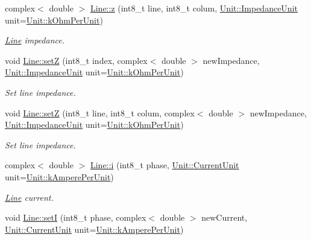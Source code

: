 \begin{DoxyCompactItemize}
complex$<$ double $>$ \hyperlink{group___models_ga508b2db19afc02064c1afe494a25ebcc}{Line\+::z} (int8\+\_\+t line, int8\+\_\+t colum, \hyperlink{class_unit_a3747e779c805df24a71961290be3fbdf}{Unit\+::\+Impedance\+Unit} unit=\hyperlink{class_unit_a3747e779c805df24a71961290be3fbdfa9327dc8628a47375d70037499f9d0910}{Unit\+::k\+Ohm\+Per\+Unit})
\begin{DoxyCompactList}\small\item\em \hyperlink{class_line}{Line} impedance. \end{DoxyCompactList}\item 
void \hyperlink{group___models_ga2b8fe47ae4ae2d4422d9431e17b4927d}{Line\+::set\+Z} (int8\+\_\+t index, complex$<$ double $>$ new\+Impedance, \hyperlink{class_unit_a3747e779c805df24a71961290be3fbdf}{Unit\+::\+Impedance\+Unit} unit=\hyperlink{class_unit_a3747e779c805df24a71961290be3fbdfa9327dc8628a47375d70037499f9d0910}{Unit\+::k\+Ohm\+Per\+Unit})
\begin{DoxyCompactList}\small\item\em Set line impedance. \end{DoxyCompactList}\item 
void \hyperlink{group___models_ga0c6767e389e4ee26932b6f22ca8f89f5}{Line\+::set\+Z} (int8\+\_\+t line, int8\+\_\+t colum, complex$<$ double $>$ new\+Impedance, \hyperlink{class_unit_a3747e779c805df24a71961290be3fbdf}{Unit\+::\+Impedance\+Unit} unit=\hyperlink{class_unit_a3747e779c805df24a71961290be3fbdfa9327dc8628a47375d70037499f9d0910}{Unit\+::k\+Ohm\+Per\+Unit})
\begin{DoxyCompactList}\small\item\em Set line impedance. \end{DoxyCompactList}\item 
complex$<$ double $>$ \hyperlink{group___models_ga2ad899adaa4f2e25b38c58e076db94ea}{Line\+::i} (int8\+\_\+t phase, \hyperlink{class_unit_a0794cf6c9682f48296dd4a5315389787}{Unit\+::\+Current\+Unit} unit=\hyperlink{class_unit_a0794cf6c9682f48296dd4a5315389787aeed3b50e464d581cb630181a3b6a0709}{Unit\+::k\+Ampere\+Per\+Unit})
\begin{DoxyCompactList}\small\item\em \hyperlink{class_line}{Line} current. \end{DoxyCompactList}\item 
void \hyperlink{group___models_gab01ecad45ee9d81a33b9f5806533066c}{Line\+::set\+I} (int8\+\_\+t phase, complex$<$ double $>$ new\+Current, \hyperlink{class_unit_a0794cf6c9682f48296dd4a5315389787}{Unit\+::\+Current\+Unit} unit=\hyperlink{class_unit_a0794cf6c9682f48296dd4a5315389787aeed3b50e464d581cb630181a3b6a0709}{Unit\+::k\+Ampere\+Per\+Unit})

\end{DoxyCompactItemize}
